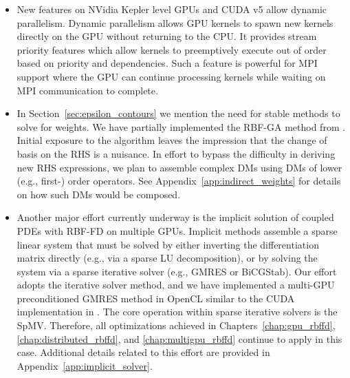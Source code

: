 \begin{itemize}
\item 
New features on NVidia Kepler level GPUs and CUDA v5 allow dynamic parallelism. Dynamic parallelism allows GPU kernels to spawn new kernels directly on the GPU without returning to the CPU. It provides stream priority features which allow kernels to preemptively execute out of order based on priority and dependencies. Such a feature is powerful for MPI support where the GPU can continue processing kernels while waiting on MPI communication to complete. 
\item In Section~\ref{sec:epsilon_contours} we mention the need for stable methods to solve for weights. We have partially implemented the RBF-GA method from \cite{Fornberg2012}.  Initial exposure to the algorithm leaves the impression that the change of basis on the RHS is a nuisance. In effort to bypass the difficulty in deriving new RHS expressions, we plan to assemble complex DMs using DMs of lower (e.g., first-) order operators. See Appendix~\ref{app:indirect_weights} for details on how such DMs would be composed.
\item Another major effort currently underway is the implicit solution of coupled PDEs with RBF-FD on multiple GPUs. Implicit methods assemble a sparse linear system that must be solved by either inverting the differentiation matrix directly (e.g., via a sparse LU decomposition), or by solving the system via a sparse iterative solver (e.g., GMRES or BiCGStab).
Our effort adopts the iterative solver method, and we have implemented a multi-GPU preconditioned GMRES method in OpenCL similar to the CUDA implementation in \cite{Bahi2011}. The core operation within sparse iterative solvers is the SpMV. Therefore, all optimizations achieved in Chapters~\ref{chap:gpu_rbffd}, \ref{chap:distributed_rbffd}, and \ref{chap:multigpu_rbffd} continue to apply in this case. Additional details related to this effort are provided in Appendix~\ref{app:implicit_solver}.

\end{itemize}

